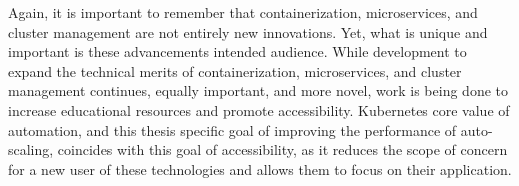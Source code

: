 Again, it is important to remember that containerization, microservices, and
cluster management are not entirely new innovations. Yet, what is unique and
important is these advancements intended audience. While development to expand
the technical merits of containerization, microservices, and cluster management
continues, equally important, and more novel, work is being done to increase
educational resources and promote accessibility. Kubernetes core value of
automation, and this thesis specific goal of improving the performance of
auto-scaling, coincides with this goal of accessibility, as it reduces the scope
of concern for a new user of these technologies and allows them to focus on
their application.
